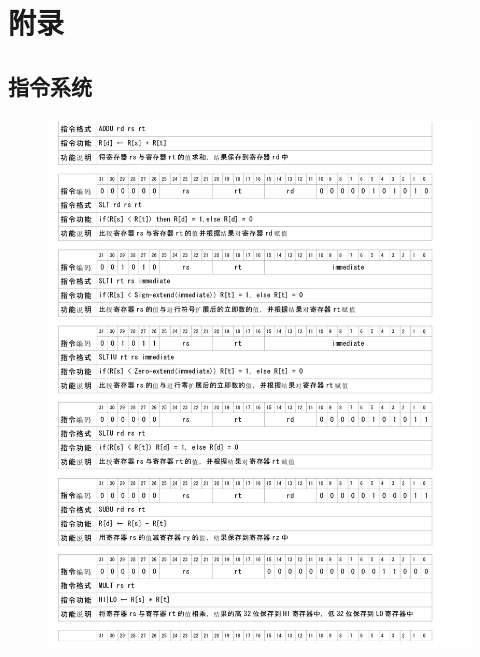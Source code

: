 \section{附录}
    \subsection{指令系统}
    \begin{figure}[!hbp]
            \centering
            \includegraphics[width=\textwidth]{chart/insert1.jpg}
    \end{figure}
    

